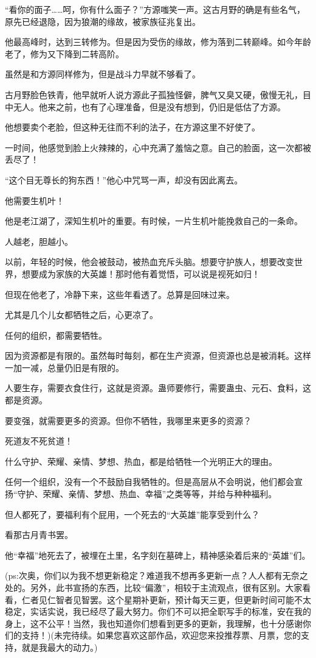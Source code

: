 \begin{this_body}
“看你的面子……呵，你有什么面子？”方源嗤笑一声。这古月野的确是有些名气，原先已经退隐，因为狼潮的缘故，被家族征兆复出。

他最高峰时，达到三转修为。但是因为受伤的缘故，修为落到二转巅峰。如今年龄老了，修为又下降到二转高阶。

虽然是和方源同样修为，但是战斗力早就不够看了。

古月野脸色铁青，他早就听人说方源此子孤独怪僻，脾气又臭又硬，傲慢无礼，目中无人。他来之前，也有了心理准备，但是没有想到，仍旧是低估了方源。

他想要卖个老脸，但这种无往而不利的法子，在方源这里不好使了。

一时间，他感觉到脸上火辣辣的，心中充满了羞恼之意。自己的脸面，这一次都被丢尽了！

“这个目无尊长的狗东西！”他心中咒骂一声，却没有因此离去。

他需要生机叶！

他是老江湖了，深知生机叶的重要。有时候，一片生机叶能挽救自己的一条命。

人越老，胆越小。

以前，年轻的时候，他会被鼓动，被热血充斥头脑。想要守护族人，想要改变世界，想要成为家族的大英雄！那时他有着觉悟，可以说是视死如归！

但现在他老了，冷静下来，这些年看透了。总算是回味过来。

尤其是几个儿女都牺牲之后，心更凉了。

任何的组织，都需要牺牲。

因为资源都是有限的。虽然每时每刻，都在生产资源，但资源也总是被消耗。这样一加一减，总量仍旧是有限的。

人要生存，需要衣食住行，这就是资源。蛊师要修行，需要蛊虫、元石、食料，这都是资源。

要变强，就需要更多的资源。但你不牺牲，我哪里来更多的资源？

死道友不死贫道！

什么守护、荣耀、亲情、梦想、热血，都是给牺牲一个光明正大的理由。

任何一个组织，没有一个不鼓励自我牺牲的。但是高层从不会明说，他们都会宣扬“守护、荣耀、亲情、梦想、热血、幸福”之类等等，并给与种种福利。

但人都死了，要福利有个屁用，一个死去的“大英雄”能享受到什么？

看那古月青书罢。

他“幸福”地死去了，被埋在土里，名字刻在墓碑上，精神感染着后来的“英雄”们。

(ps:次奥，你们以为我不想更新稳定？难道我不想再多更新一点？人人都有无奈之处的。另外，此书宣扬的东西，比较“偏激”，相较于主流观点，很有区别。大家看看，仁者见仁智者见智罢。这个星期补更新，预计每天三更，但更新时间可能不太稳定，实话实说，我已经尽了最大努力。你们不可以把全职写手的标准，安在我的身上，这不公平！当然，我也知道你们想看到更多的更新，我理解，也十分感谢你们的支持！)(未完待续。如果您喜欢这部作品，欢迎您来投推荐票、月票，您的支持，就是我最大的动力。)

\end{this_body}

